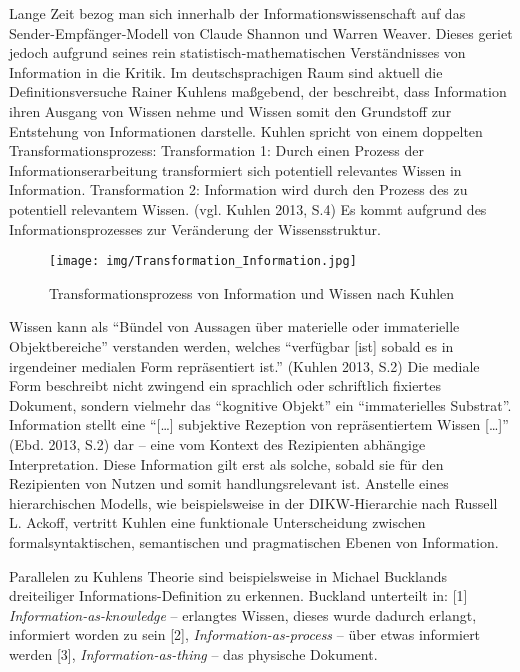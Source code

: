 \documentclass[a4paper,
fontsize=11pt,
oneside,
numbers=noperiodatend,
parskip=half-,
bibliography=totoc,
final
]{scrartcl}
\begin{document}
Lange Zeit bezog man sich innerhalb der Informationswissenschaft auf das
Sender-Empfänger-Modell von Claude Shannon und Warren Weaver. Dieses
geriet jedoch aufgrund seines rein statistisch-mathematischen
Verständnisses von Information in die Kritik. Im deutschsprachigen Raum
sind aktuell die Definitionsversuche Rainer Kuhlens maßgebend, der
beschreibt, dass Information ihren Ausgang von Wissen nehme und Wissen
somit den Grundstoff zur Entstehung von Informationen darstelle. Kuhlen
spricht von einem doppelten Transformationsprozess: Transformation 1:
Durch einen Prozess der Informationserarbeitung transformiert sich
potentiell relevantes Wissen in Information. Transformation 2:
Information wird durch den Prozess des zu potentiell relevantem Wissen.
(vgl. Kuhlen 2013, S.4) Es kommt aufgrund des Informationsprozesses zur
Veränderung der Wissensstruktur.

\begin{figure}
\centering
\texttt{[image: img/Transformation\_Information.jpg]}
\caption{Transformationsprozess von Information und Wissen nach Kuhlen}
\end{figure}

Wissen kann als \enquote{Bündel von Aussagen über materielle oder
immaterielle Objektbereiche} verstanden werden, welches
\enquote{verfügbar {[}ist{]} sobald es in irgendeiner medialen Form
repräsentiert ist.} (Kuhlen 2013, S.2) Die mediale Form beschreibt nicht
zwingend ein sprachlich oder schriftlich fixiertes Dokument, sondern
vielmehr das \enquote{kognitive Objekt} ein \enquote{immaterielles
Substrat}. Information stellt eine \enquote{{[}\ldots{}{]} subjektive
Rezeption von repräsentiertem Wissen {[}\ldots{}{]}} (Ebd. 2013, S.2)
dar -- eine vom Kontext des Rezipienten abhängige Interpretation. Diese
Information gilt erst als solche, sobald sie für den Rezipienten von
Nutzen und somit handlungsrelevant ist. Anstelle eines hierarchischen
Modells, wie beispielsweise in der DIKW-Hierarchie nach Russell L.
Ackoff, vertritt Kuhlen eine funktionale Unterscheidung zwischen
formalsyntaktischen, semantischen und pragmatischen Ebenen von
Information.

Parallelen zu Kuhlens Theorie sind beispielsweise in Michael Bucklands
dreiteiliger Informations-Definition zu erkennen. Buckland unterteilt
in: {[}1{]} \emph{Information-as-knowledge} -- erlangtes Wissen, dieses
wurde dadurch erlangt, informiert worden zu sein {[}2{]},
\emph{Information-as-process} -- über etwas informiert werden {[}3{]},
\emph{Information-as-thing} -- das physische Dokument.
\end{document}
